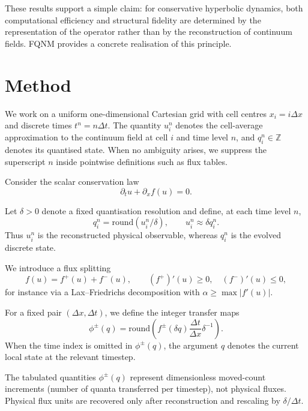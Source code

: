 \documentclass[sn-basic]{sn-jnl}
\theoremstyle{plain}
\theoremstyle{remark}
\begin{document}
These results support a simple claim: for conservative hyperbolic dynamics, both computational efficiency and structural fidelity are determined by the representation of the operator rather than by the reconstruction of continuum fields. FQNM provides a concrete realisation of this principle.

\section{Method}
\label{sec:method}

We work on a uniform one-dimensional Cartesian grid with cell centres $x_i=i\Delta x$ and discrete times $t^n=n\Delta t$. The quantity $u_i^n$ denotes the cell-average approximation to the continuum field at cell $i$ and time level $n$, and $q_i^n\in\mathbb Z$ denotes its quantised state. When no ambiguity arises, we suppress the superscript $n$ inside pointwise definitions such as flux tables.

Consider the scalar conservation law
\begin{equation}
\partial_t u + \partial_x f(u) = 0.
\label{eq:conservation_law}
\end{equation}

Let $\delta>0$ denote a fixed quantisation resolution and define, at each time level $n$,
\begin{equation}
q_i^n = \mathrm{round}(u_i^n / \delta), \qquad u_i^n \approx \delta q_i^n.
\label{eq:quantisation}
\end{equation}
Thus $u_i^n$ is the reconstructed physical observable, whereas $q_i^n$ is the evolved discrete state.

We introduce a flux splitting
 \begin{equation}
 f(u) = f^+(u) + f^-(u), \qquad (f^+)'(u) \ge 0,\quad (f^-)'(u) \le 0,
 \label{eq:flux_splitting}
 \end{equation}
 for instance via a Lax--Friedrichs decomposition with $\alpha \ge \max |f'(u)|$.

For a fixed pair $(\Delta x,\Delta t)$, we define the integer transfer maps
\begin{equation}
\phi^\pm(q) = \mathrm{round}\!\left(
 f^\pm(\delta q)\frac{\Delta t}{\Delta x}\delta^{-1}
\right).
\label{eq:flux_table}
\end{equation}
When the time index is omitted in $\phi^\pm(q)$, the argument $q$ denotes the current local state at the relevant timestep.

The tabulated quantities $\phi^\pm(q)$ represent dimensionless moved-count increments (number of quanta transferred per timestep), not physical fluxes. Physical flux units are recovered only after reconstruction and rescaling by $\delta/\Delta t$.
\end{document}
